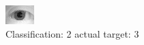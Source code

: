 \begin{figure}[h!]
\begin{center}
\includegraphics[width=0.60\columnwidth]{figures/ID1053_class_2_target_3.png}
\end{center}
\caption{ Classification: 2 actual target: 3}
\label{fig:ID1053_class_2_target_3}
\end{figure}
